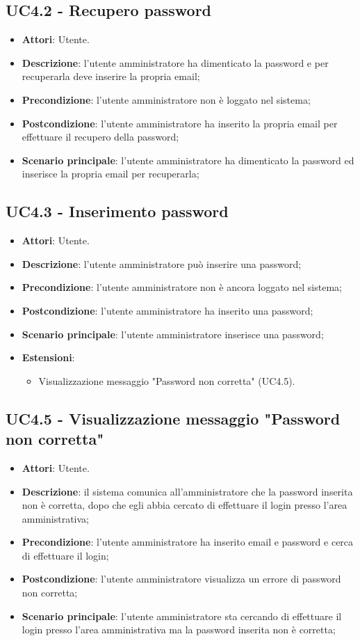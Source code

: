 \documentclass[../AnalisiDeiRequisiti_v3.0.0.tex]{subfiles}
\begin{document}
\subsection{UC4.2 - Recupero password} 
\label{sssec:UC4.2} 
\begin{itemize} 
\item \textbf{Attori}: Utente.
\item \textbf{Descrizione}: l'utente amministratore ha dimenticato la password e per recuperarla deve inserire la propria email;
\item \textbf{Precondizione}: l'utente amministratore non è loggato nel sistema;
\item \textbf{Postcondizione}: l'utente amministratore ha inserito la propria email per effettuare il recupero della password;
\item \textbf{Scenario principale}: l'utente amministratore ha dimenticato la password ed inserisce la propria email per recuperarla;
\end{itemize} 
\subsection{UC4.3 - Inserimento password} 
\label{sssec:UC4.3} 
\begin{itemize} 
\item \textbf{Attori}: Utente.
\item \textbf{Descrizione}: l'utente amministratore può inserire una password;
\item \textbf{Precondizione}: l'utente amministratore non è ancora loggato nel sistema;
\item \textbf{Postcondizione}: l'utente amministratore ha inserito una password;
\item \textbf{Scenario principale}: l'utente amministratore inserisce una password;
\item \textbf{Estensioni}:\begin{itemize}\item Visualizzazione messaggio "Password non corretta" (UC4.5).\end{itemize}
\end{itemize} 
\subsection{UC4.5 - Visualizzazione messaggio "Password non corretta"} 
\label{sssec:UC4.5} 
\begin{itemize} 
\item \textbf{Attori}: Utente.
\item \textbf{Descrizione}: il sistema comunica all'amministratore che la password inserita non è corretta, dopo che egli abbia cercato di effettuare il login presso l'area amministrativa;
\item \textbf{Precondizione}: l'utente amministratore ha inserito email e password e cerca di effettuare il login;
\item \textbf{Postcondizione}: l'utente amministratore visualizza un errore di password non corretta;
\item \textbf{Scenario principale}: l'utente amministratore sta cercando di effettuare il login presso l'area amministrativa ma la password inserita non è corretta;
\end{itemize} 
\end{document}
